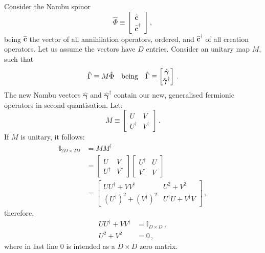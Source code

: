 Consider the Nambu spinor
\[
	\hat \Phi \equiv \begin{bmatrix}
		\hat{\mathbf{c}} \\ \hat{\mathbf{c}}^\dagger
	\end{bmatrix} \, ,
\]
being $\hat{\mathbf{c}}$ the vector of all annihilation operators, ordered, and $\hat{\mathbf{c}}^\dagger$ of all creation operators. Let us assume the vectors have $D$ entries. Consider an unitary map $M$, such that
\[
	\hat \Gamma \equiv M \hat \Phi
	\qq{being}
	\hat \Gamma \equiv \begin{bmatrix}
		\hat{\bm{\gamma}} \\ \hat{\bm{\gamma}}^\dagger
	\end{bmatrix} \, .
\]
The new Nambu vectors $\hat{\bm{\gamma}}$ and $\hat{\bm{\gamma}}^\dagger$ contain our new, generalised fermionic operators in second quantisation. Let:
\[
	M \equiv \begin{bmatrix}
		U & V \\ U^\dagger & V^\dagger
	\end{bmatrix} \, .
\]
If $M$ is unitary, it follows:
\[
\begin{aligned}
	\mathbb{I}_{2D \times 2D} &= MM^\dagger \\
	&= \begin{bmatrix}
		U & V \\ U^\dagger & V^\dagger
	\end{bmatrix} \begin{bmatrix}
		U^\dagger & U \\ V^\dagger & V
	\end{bmatrix} \\
	&= \begin{bmatrix}
		UU^\dagger + VV^\dagger & U^2 + V^2 \\
		\left(U^\dagger\right)^2 + \left(V^\dagger\right)^2 & U^\dagger U + V^\dagger V
	\end{bmatrix} \, ,
\end{aligned}
\]
therefore, 
\begin{align}
	UU^\dagger + VV^\dagger &= \mathbb{I}_{D \times D} \, , \label{appeq:UU++VV+=I} \\
	U^2 + V^2 &= 0 \label{appeq:U2+V2=0} \, ,
\end{align}
where in last line $0$ is intended as a $D \times D$ zero matrix.

